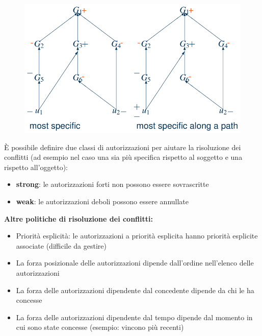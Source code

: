 \documentclass{report}
\begin{document}
\begin{figure}[H]
    \centering
    \includegraphics[width=0.7\linewidth]{images/conflict.png}
\end{figure}

\noindent È possibile definire due classi di autorizzazioni per aiutare 
la risoluzione dei conflitti (ad esempio nel caso una sia più specifica 
rispetto al soggetto e una rispetto all'oggetto):
\begin{itemize}
    \item \textbf{strong}: le autorizzazioni forti non possono essere sovrascritte
    \item \textbf{weak}: le autorizzazioni deboli possono essere annullate
\end{itemize}

\noindent \textbf{Altre politiche di risoluzione dei conflitti:}
\begin{itemize}
    \item Priorità esplicità: le autorizzazioni a priorità esplicita hanno priorità esplicite associate (difficile da gestire)
    \item La forza posizionale delle autorizzazioni dipende dall'ordine nell'elenco delle autorizzazioni 
    \item La forza delle autorizzazioni dipendente dal concedente dipende da chi le ha concesse 
    \item La forza delle autorizzazioni dipendente dal tempo dipende dal momento in cui sono state concesse (esempio: vincono più recenti) 
\end{itemize}
\end{document}
